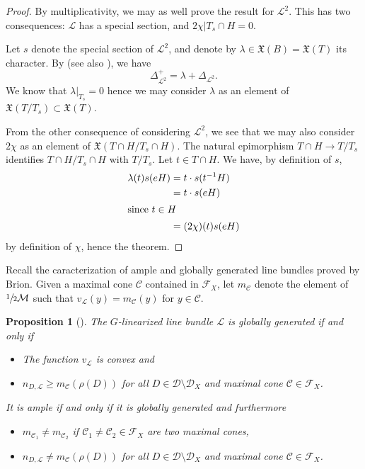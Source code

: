 \documentclass{amsart}
\newtheorem{prop}[thm]{Proposition}
\theoremstyle{definition}
\begin{document}
\begin{proof}
By multiplicativity, we may as well prove the result for $\mathcal{L}^2$.
This has two consequences: $\mathcal{L}$ has a special section, and 
$2\chi|{T_s\cap H}=0$.  

Let $s$ denote the special section of $\mathcal{L}^2$, and denote by 
$\lambda\in \mathfrak{X}(B)=\mathfrak{X}(T)$ its character.  
By \cite[Proposition 3.3]{Bri89} (see also \cite[Section 5.3]{Bria}), 
we have 
\[
\Delta^+_{\mathcal{L}^2}=\lambda + \Delta_{\mathcal{L}^2}.
\]
We know that $\lambda|_{T_s}=0$ hence we may consider $\lambda$ as an 
element of $\mathfrak{X}(T/T_s)\subset \mathfrak{X}(T)$.

From the other consequence of considering $\mathcal{L}^2$, we see that 
we may also consider $2\chi$ as an element of $\mathfrak{X}(T\cap H/T_s\cap H)$.
The natural epimorphism $T\cap H\rightarrow T/T_s$ identifies 
$T\cap H/T_s\cap H$ with $T/T_s$.
Let $t\in T\cap H$. We have, by definition of $s$, 
\begin{align*}
\lambda(t)s(eH) &= t\cdot s(t^{-1}H) \\
&= t\cdot s(eH) \\
\intertext{since $t\in H$}
&= (2\chi)(t) s(eH)
\end{align*}
by definition of $\chi$, hence the theorem.
\end{proof}

Recall the caracterization of ample and globally generated line bundles 
proved by Brion. Given a maximal cone $\mathcal{C}$ contained in $\mathcal{F}_X$,   
let $m_{\mathcal{C}}$ denote the element of 
$\sfrac{1}{2}\mathcal{M}$ such that $v_{\mathcal{L}}(y)=m_{\mathcal{C}}(y)$ 
for $y\in \mathcal{C}$.

\begin{prop}[{\cite[Th\'eor\`eme 3.3]{Bri89}}]
\label{prop_ample}
The $G$-linearized line bundle $\mathcal{L}$ is \emph{globally generated} 
if and only if 
\begin{itemize}
\item The function $v_{\mathcal{L}}$ is convex and 
\item $n_{D,\mathcal{L}} \geq m_{\mathcal{C}}(\rho(D))$ for all $D\in \mathcal{D} \setminus \mathcal{D}_{X}$ 
and maximal cone $\mathcal{C} \in \mathcal{F}_X$. 
\end{itemize}
It is \emph{ample} if and only if it is globally generated and furthermore 
\begin{itemize}
\item $m_{\mathcal{C}_1} \neq m_{\mathcal{C}_2}$ if 
$\mathcal{C}_1\neq \mathcal{C}_2\in \mathcal{F}_X$ are two maximal cones, 
\item $n_{D,\mathcal{L}} \neq m_{\mathcal{C}}(\rho(D))$ for all $D\in \mathcal{D} \setminus \mathcal{D}_{X}$ 
and maximal cone $\mathcal{C} \in \mathcal{F}_X$.
\end{itemize}
\end{prop}
\end{document}
